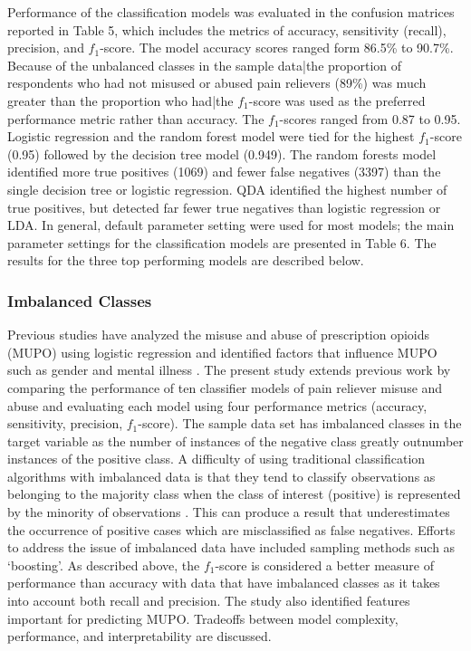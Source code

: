 Performance of the classification models was evaluated in the confusion 
matrices reported in Table 5, which includes the metrics of accuracy, 
sensitivity (recall), precision, and $f_1$-score. The model accuracy 
scores ranged form 86.5\% to 90.7\%. Because of the unbalanced classes in 
the sample data|the proportion of respondents who had not misused or abused 
pain relievers (89\%) was much greater than the proportion who had|the 
$f_1$-score was used as the preferred performance metric rather than 
accuracy. The $f_1$-scores ranged from 0.87 to 0.95. Logistic regression 
and the random forest model were tied for the highest $f_1$-score (0.95) 
followed by the decision tree model (0.949). The random forests model 
identified more true positives (1069) and fewer false negatives (3397) 
than the single decision tree or logistic regression. QDA identified 
the highest number of true positives, but detected far fewer true negatives
than logistic regression or LDA. In general, default parameter setting 
were used for most models; the main parameter settings for the 
classification models are presented in Table 6. The results for the 
three top performing models are described below.  


\subsubsection{Imbalanced Classes}

Previous studies have analyzed the misuse and abuse of prescription opioids
(MUPO) using logistic regression and identified factors that influence MUPO 
such as gender and mental illness \cite{rice12, unick13, jones15, mccabe12}. 
The present study extends previous work by comparing the performance of ten 
classifier models of pain reliever misuse and abuse and evaluating each model 
using four performance metrics (accuracy, sensitivity, precision, $f_1$-score). 
The sample data set has imbalanced classes in the target variable as the 
number of instances of the negative class greatly outnumber instances of 
the positive class. A difficulty of using traditional classification 
algorithms with imbalanced data is that they tend to classify observations
as belonging to the majority class when the class of interest (positive) is 
represented by the minority of observations \cite{brown12, yun09}. This can 
produce a result that underestimates the occurrence of positive cases which 
are misclassified as false negatives. Efforts to address the issue of 
imbalanced data have included sampling methods such as `boosting'. 
As described above, the $f_1$-score is considered a better measure of 
performance than accuracy with data that have imbalanced classes as it 
takes into account both recall and precision. The study also identified 
features important for predicting MUPO. Tradeoffs between model complexity,
performance, and interpretability are discussed. 

